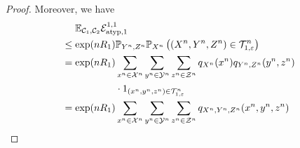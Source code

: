 \documentclass[journal]{IEEEtran}
\newcommand{\channelpmf}{q}
\newcommand{\codebookRateOne}{R_1}
\newcommand{\channelInOne}{X}
\newcommand{\channelInOneAlph}{\mathcal{X}}
\newcommand{\channelInOneAlphElement}{x}
\newcommand{\channelInTwo}{Y}
\newcommand{\channelInTwoAlph}{\mathcal{Y}}
\newcommand{\channelInTwoAlphElement}{y}
\newcommand{\channelOut}{Z}
\newcommand{\channelOutAlph}{\mathcal{Z}}
\newcommand{\channelOutAlphElement}{z}
\newcommand{\codebookOne}{\mathcal{C}_1}
\newcommand{\codebookTwo}{\mathcal{C}_2}
\newcommand{\codebookBlocklength}{n}
\newcommand{\Expectation}{\mathbb{E}}
\newcommand{\Probability}{\mathbb{P}}
\newcommand{\indicator}[1]{1_{#1}}
\newcommand{\typicalityParam}{\varepsilon}
\newcommand{\typicalSetIndex}[3]{\mathcal{T}_{#3,#1}^{#2}}
\newcommand{\errorprob}{\mathcal{E}}
\begin{document}
\begin{proof}
Moreover, we have
\begin{align}
&\begin{aligned}
\hphantom{={}}
\Expectation_{\codebookOne, \codebookTwo} \errorprob_{\mathrm{atyp},1}^{1,1}
\end{aligned}
\\
\label{proof:mac-coding-atypical-without-codebook}
&\begin{aligned}
\leq
\exp(\codebookBlocklength\codebookRateOne)
\Probability_{\channelInTwo^\codebookBlocklength, \channelOut^\codebookBlocklength}\Probability_{\channelInOne^\codebookBlocklength} \left(
  (\channelInOne^\codebookBlocklength, \channelInTwo^\codebookBlocklength, \channelOut^\codebookBlocklength)
  \in
  \typicalSetIndex{\typicalityParam}{\codebookBlocklength}{1}
\right)
\end{aligned}
\\
&\begin{aligned}
=
\exp(\codebookBlocklength\codebookRateOne)
&\sum_{\channelInOneAlphElement^\codebookBlocklength \in \channelInOneAlph^\codebookBlocklength}
\sum_{\channelInTwoAlphElement^\codebookBlocklength \in \channelInTwoAlph^\codebookBlocklength}
\sum_{\channelOutAlphElement^\codebookBlocklength \in \channelOutAlph^\codebookBlocklength}
\channelpmf_{\channelInOne^\codebookBlocklength}(\channelInOneAlphElement^\codebookBlocklength)
\channelpmf_{\channelInTwo^\codebookBlocklength, \channelOut^\codebookBlocklength}(\channelInTwoAlphElement^\codebookBlocklength, \channelOutAlphElement^\codebookBlocklength)
\\
&\cdot \indicator{(\channelInOneAlphElement^\codebookBlocklength,\channelInTwoAlphElement^\codebookBlocklength,\channelOutAlphElement^\codebookBlocklength)
           \in
           \typicalSetIndex{\typicalityParam}{\codebookBlocklength}{1}
          }
\end{aligned}
\\
\label{proof:mac-coding-atypical-reformulation}
&\begin{aligned}
=
\exp(\codebookBlocklength\codebookRateOne)
&\sum_{\channelInOneAlphElement^\codebookBlocklength \in \channelInOneAlph^\codebookBlocklength}
\sum_{\channelInTwoAlphElement^\codebookBlocklength \in \channelInTwoAlph^\codebookBlocklength}
\sum_{\channelOutAlphElement^\codebookBlocklength \in \channelOutAlph^\codebookBlocklength}
\channelpmf_{\channelInOne^\codebookBlocklength, \channelInTwo^\codebookBlocklength, \channelOut^\codebookBlocklength}(\channelInOneAlphElement^\codebookBlocklength, \channelInTwoAlphElement^\codebookBlocklength, \channelOutAlphElement^\codebookBlocklength)

\end{aligned}
\end{align}
\end{proof}
\end{document}
